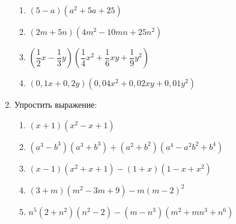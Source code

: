 \documentclass[12pt, a4paper]{article}
\begin{document}
\begin{enumerate}
\begin{multicols}{2}
		\begin{enumerate}[label=\asbuk*)]
			\item $(5-a)(a^2+5a+25)$
			\item $(2m+5n)(4m^2-10mn+25n^2)$
			\item $\left(\dfrac{1}{2}x-\dfrac{1}{3}y\right)\left(\dfrac{1}{4}x^2+\dfrac{1}{6}xy+\dfrac{1}{9}y^2\right)$
			\item $(0,1x+0,2y)(0,04x^2+0,02xy+0,01y^2)$
		\end{enumerate}
	\end{multicols}
	\item Упростить выражение:
	\begin{multicols}{2}
		\begin{enumerate}[label=\asbuk*)]
			\item $(x+1)(x^2-x+1)$
			\item $(a^3-b^3)(a^3+b^3)+(a^2+b^2)(a^4-a^2b^2+b^4)$
			\item $(x-1)(x^2+x+1)-(1+x)(1-x+x^2)$
			\item $(3+m)(m^2-3m+9)-m(m-2)^2$
			\item $n^5(2+n^2)(n^2-2)-(m-n^3)(m^2+mn^3+n^6)$
		\end{enumerate}
	\end{multicols}
\end{enumerate}
	
\end{document}
